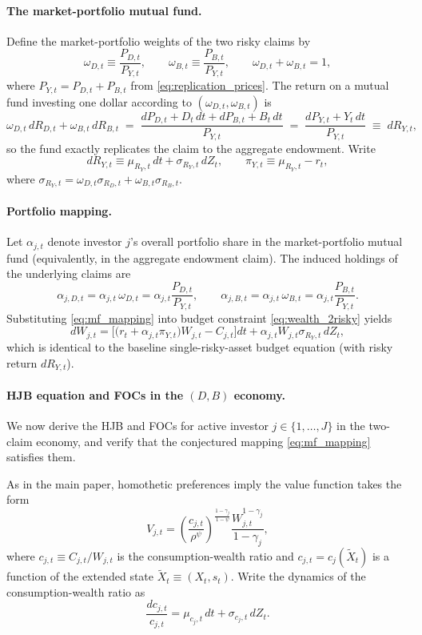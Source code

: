 \documentclass[11pt,english]{article}
\begin{document}
\paragraph{The market-portfolio mutual fund.}
Define the market-portfolio weights of the two risky claims by
\[
    \omega_{D,t}\equiv \frac{P_{D,t}}{P_{Y,t}},
    \qquad
    \omega_{B,t}\equiv \frac{P_{B,t}}{P_{Y,t}},
    \qquad
    \omega_{D,t}+\omega_{B,t}=1,
\]
where $P_{Y,t}=P_{D,t}+P_{B,t}$ from \eqref{eq:replication_prices}. The return on a mutual fund investing one dollar according to $(\omega_{D,t},\omega_{B,t})$ is
\[
    \omega_{D,t}\,dR_{D,t}+\omega_{B,t}\,dR_{B,t}
    \;=\;
    \frac{dP_{D,t}+D_t\,dt+dP_{B,t}+B_t\,dt}{P_{Y,t}}
    \;=\;
    \frac{dP_{Y,t}+Y_t\,dt}{P_{Y,t}}
    \;\equiv\; dR_{Y,t},
\]
so the fund exactly replicates the claim to the aggregate endowment.
Write
\[
    dR_{Y,t}\equiv \mu_{R_Y,t}\,dt+\sigma_{R_Y,t}\,dZ_t,
    \qquad
    \pi_{Y,t}\equiv \mu_{R_Y,t}-r_t,
\]
where $\sigma_{R_Y,t}=\omega_{D,t}\sigma_{R_D,t}+\omega_{B,t}\sigma_{R_B,t}$.

\paragraph{Portfolio mapping.}
Let $\alpha_{j,t}$ denote investor $j$'s overall portfolio share in the market-portfolio mutual fund (equivalently, in the aggregate endowment claim). The induced holdings of the underlying claims are
\begin{equation}\label{eq:mf_mapping}
    \alpha_{j,D,t}= \alpha_{j,t}\,\omega_{D,t}=\alpha_{j,t}\frac{P_{D,t}}{P_{Y,t}},
    \qquad
    \alpha_{j,B,t}= \alpha_{j,t}\,\omega_{B,t}=\alpha_{j,t}\frac{P_{B,t}}{P_{Y,t}}.
\end{equation}
Substituting \eqref{eq:mf_mapping} into budget constraint \eqref{eq:wealth_2risky} yields
\[
    dW_{j,t}
    =\Big[\big(r_t+\alpha_{j,t}\pi_{Y,t}\big)W_{j,t}-C_{j,t}\Big]dt
    +\alpha_{j,t}W_{j,t}\sigma_{R_Y,t}\,dZ_t,
\]
which is identical to the baseline single-risky-asset budget equation (with risky return $dR_{Y,t}$).

\paragraph{HJB equation and FOCs in the $(D,B)$ economy.}
We now derive the HJB and FOCs for active investor $j\in\{1,\ldots,J\}$ in the two-claim economy, and verify that the conjectured mapping \eqref{eq:mf_mapping} satisfies them.

As in the main paper, homothetic preferences imply the value function takes the form
\begin{equation}\label{eq:Vj_DB}
    V_{j,t} = \left(\frac{c_{j,t}}{\rho^\psi}\right)^{\!\frac{1-\gamma_j}{1-\psi}}
    \frac{W_{j,t}^{1-\gamma_j}}{1-\gamma_j},
\end{equation}
where $c_{j,t}\equiv C_{j,t}/W_{j,t}$ is the consumption-wealth ratio and $c_{j,t}=c_j(\widetilde{X}_t)$ is a function of the extended state $\widetilde{X}_t \equiv (X_t,s_t)$. Write the dynamics of the consumption-wealth ratio as
\[
    \frac{dc_{j,t}}{c_{j,t}} = \mu_{c_j,t}\,dt + \sigma_{c_j,t}\,dZ_t.
\]
\end{document}
